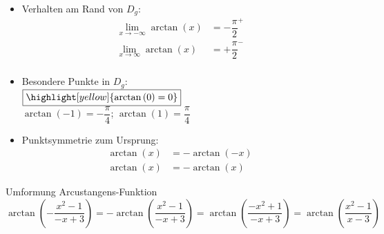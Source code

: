 \begin{minipage}[t]{0.45\linewidth}
\begin{itemize}[leftmargin=*]
{{
            }\\[2.0ex]
            $D_{g} = \mathbb{R}$; \qquad $W_{g} = \left] \ -\dfrac{\pi}{2}; +\dfrac{\pi}{2} \ \right[$\\[2.0ex]
            waagerechte Asymptoten:\\[1.5ex]
            $y = - \dfrac{\pi}{2}$; \qquad $y = \dfrac{\pi}{2}$\\[-2.0ex]
            }
        \item Verhalten am Rand von $D_{g}$: \\[-1.0ex]{
            \vspace{-2.0ex}
            \begin{align*}
                \lim\limits_{x \to -\infty} \arctan\left(x\right) &= - {\dfrac{\pi}{2}}^{+} &&\\[2.0ex]
                \lim\limits_{x \to \infty} \arctan\left(x\right) &= + {\dfrac{\pi}{2}}^{-} &&\\[-4.0ex]
            \end{align*}
            }
        \item Besondere Punkte in $D_{g}$:\\{
            $\boxed{\highlight[yellow]{\arctan\left(0\right) = 0}}$\\[1.0ex]
            $\arctan\left(-1\right) = -\dfrac{\pi}{4}$; \qquad $\arctan\left(1\right) = \dfrac{\pi}{4}$
        }
        \item Punktsymmetrie zum Ursprung: \\[-1.0ex]{
            \vspace{-2.0ex}
            \begin{align*}
                \arctan\left(x\right) &= -\arctan\left(-x\right) && \\[1.5ex]
                \arctan\left(x\right) &= -\arctan\left(x\right) &&
            \end{align*}
            }
    \end{itemize}
\end{minipage}
\begin{Example}{Umformung Arcustangens-Funktion}{}
    $\arctan\left(-\dfrac{x^{2} -1}{-x + 3}\right) = - \arctan\left(\dfrac{x^{2} -1}{-x + 3}\right) = \arctan\left(\dfrac{-x^{2} + 1}{-x + 3}\right) = \arctan\left(\dfrac{x^{2} -1}{x - 3}\right)$
\end{Example}
